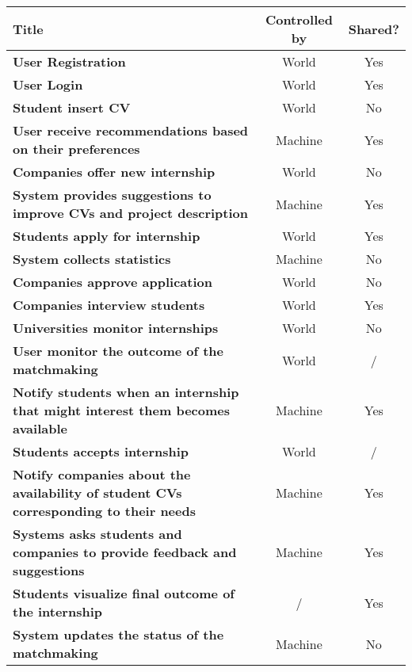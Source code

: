 \begin{table}[H]
    \centering 
    \begin{tabular}{|p{22em} | c | c |}
    \hline
    \rowcolor{bluepoli!40} 
    \textbf{Title} & \textbf{Controlled by} & \textbf{Shared?} \T\B \\
    \hline \hline
    \textbf{User Registration} & World & Yes\T\B \\
    \hline
    \textbf{User Login} & World & Yes\T\B\\
    \hline
    \textbf{Student insert CV} & World & No \B\\
    \hline
    \textbf{User receive recommendations based on their preferences} & Machine & Yes \B\\
    \hline
    \textbf{Companies offer new internship} & World & No\B\\
    \hline
    \textbf{System provides suggestions to improve CVs and project description} & Machine & Yes\B\\
    \hline
    \textbf{Students apply for internship} & World  & Yes\B\\
    \hline
    \textbf{System collects statistics} & Machine & No \B\\
    \hline
    \textbf{Companies approve application} & World & No\B\\
    \hline
    \textbf{Companies interview students} & World & Yes\B\\
    \hline
    \textbf{Universities monitor internships} & World & No\B\\
    \hline
    \textbf{User monitor the outcome of the matchmaking} & World  & /\B\\
    \hline
    \textbf{Notify students when an internship that might interest them becomes available} & Machine  & Yes\B\\
    \hline
    \textbf{Students accepts internship} & World  & /\B\\
    \hline
    \textbf{Notify companies about the availability of student CVs corresponding to their needs} & Machine & Yes\B\\
    \hline
    \textbf{Systems asks students and companies to provide feedback and suggestions} & Machine & Yes\B\\
    \hline
    \textbf{Students visualize final outcome of the internship} & / & Yes\B\\
    \hline
    \textbf{System updates the status of the matchmaking} & Machine  & No\B\\

\end{tabular}
\end{table}
